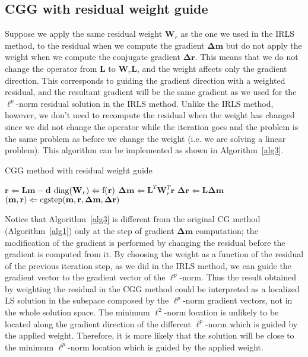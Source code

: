 \subsection{CGG with residual weight guide}
Suppose we apply the same residual weight $\mathbf W_r$ as the one we used in the IRLS method,
to the residual when we compute the gradient 
$\mathbf \Delta \mathbf m$
but do not apply the weight when we compute the conjugate gradient $\mathbf \Delta \mathbf r$.
This means that we do not change the operator from $\mathbf L$ to $\mathbf W_r \mathbf L$,
and the weight affects only the gradient direction.
This corresponds to guiding the gradient direction with a weighted residual,
and the resultant gradient will be the same gradient as 
we used for the $\ell^p$-norm residual solution in the IRLS method. 
Unlike the IRLS method, however, 
we don't need to recompute the residual when the weight has changed
since we did not change the operator while the iteration goes
and the problem is the same problem as before we change the weight 
(i.e. we are solving a linear problem).
This algorithm can be implemented as shown in Algorithm~\ref{alg3}.

\begin{algorithm}
\caption{ CGG method with residual weight guide}
\label{alg3}
\begin{algorithmic}
\STATE $ \mathbf r \Leftarrow \mathbf L \mathbf m - \mathbf d $
\STATE $ {\rm diag } (\mathbf W_r )\Leftarrow \rm f (\mathbf r) $
\STATE $ \mathbf \Delta \mathbf m \Leftarrow \mathbf L^T \mathbf W_r^T \mathbf r $
\STATE $ \mathbf \Delta \mathbf r \Leftarrow \mathbf L \mathbf \Delta \mathbf m $
\STATE $ (\mathbf m, \mathbf r) \Leftarrow \rm cgstep(\mathbf m, \mathbf r, \mathbf \Delta \mathbf m, \mathbf \Delta \mathbf r)  $
\ENDWHILE
\end{algorithmic}
\end{algorithm}

Notice that Algorithm~\ref{alg3} is different from the original
CG method (Algorithm~\ref{alg1}) only at the step of gradient $\mathbf \Delta \mathbf m$
computation;
the modification of the gradient is performed by changing the residual
before the gradient is computed from it.
By choosing the weight as a function of the residual 
of the previous iteration step,
as we did in the IRLS method, we can guide the gradient vector
to the gradient vector of the $\ell^p$-norm.
Thus the result obtained by weighting the residual in the CGG method
could be interpreted as a localized LS solution in the subspace
composed by the $\ell^p$-norm gradient vectors, 
not in the whole solution space.
The minimum $\ell^2$-norm location is unlikely to be located
along the gradient direction of the different $\ell^p$-norm 
which is guided by the applied weight. 
Therefore, it is more likely that the solution will be close to 
the minimum $\ell^p$-norm location which is guided by the applied weight.


